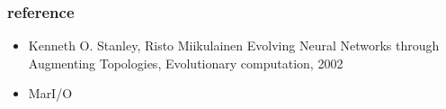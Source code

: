 \documentclass{beamer}
\begin{document}
\begin{frame}
\frametitle{reference}
\begin{itemize}
\item Kenneth O. Stanley, Risto Miikulainen Evolving Neural Networks through Augmenting Topologies, Evolutionary computation, 2002
\item MarI/O
\end{itemize}
\end{frame}

\end{document}

